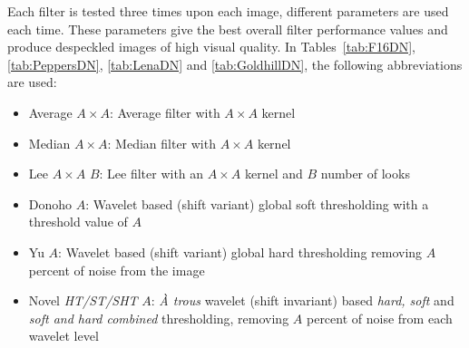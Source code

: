 \documentclass[12pt]{report}
\begin{document}
Each filter is tested three times upon each image, different parameters are used each time. These parameters
give the best overall filter performance values and produce despeckled images of high visual quality.
In Tables~\ref{tab:F16DN}, \ref{tab:PeppersDN}, \ref{tab:LenaDN} and \ref{tab:GoldhillDN},
the following abbreviations are used:
\begin{itemize}
	\item Average $A \times A$: Average filter with $A \times A$ kernel
	\item Median $A \times A$: Median filter with $A \times A$ kernel
	\item Lee $A \times A$ $B$: Lee filter with an $A \times A$ kernel and $B$ number of looks
	\item Donoho $A$: Wavelet based (shift variant) global soft thresholding with a threshold value of $A$ 	
	\item Yu $A$: Wavelet based (shift variant) global hard thresholding removing $A$ percent of noise from the image
	\item Novel \emph{HT/ST/SHT} $A$: \emph{\`A trous} wavelet (shift invariant) based \emph{hard, soft} and \emph{soft and hard combined}
		thresholding, removing $A$ percent of noise from each wavelet level
\end{itemize}
\end{document}
